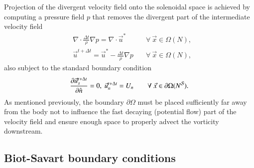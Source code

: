 \documentclass[preprint,12pt]{elsarticle}
\begin{document}
Projection of the divergent velocity field onto the solenoidal space is achieved by computing a pressure field $p$ that removes the divergent part of the intermediate velocity field
\begin{align}\label{eq:poisson}
      &\nabla\cdot\frac{\Delta t}{\rho}\nabla p = \nabla\cdot \vec{u}^* &\quad\forall\ \vec{x}\in\Omega (N),\\
      &\vec{u}^{t+\Delta t} = \vec{u}^*-\frac{\Delta t}{\rho}\nabla p &\quad\forall\ \vec{x}\in\Omega (N),
\end{align}
also subject to the standard boundary condition
\begin{align}\label{eq:BC_2}
      &\frac{\partial \vec{u}^{t+\Delta t}_s}{\partial \hat{n}} = 0,\ \vec{u}^{t+\Delta t}_n = U_n &\quad\forall\ \vec{x}\in\partial\Omega (N^{\cal S}).
\end{align}
As mentioned previously, the boundary $\partial\Omega$ must be placed sufficiently far away from the body not to influence the fast decaying (potential flow) part of the velocity field and ensure enough space to properly advect the vorticity downstream. 

\subsection{Biot-Savart boundary conditions}

\end{document}
